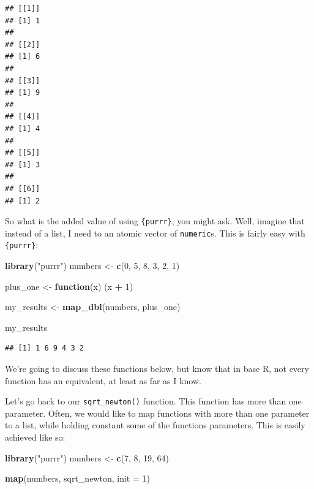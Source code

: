 \documentclass[]{gitbook}
\newenvironment{Shaded}{\begin{snugshade}}{\end{snugshade}}
\newcommand{\ControlFlowTok}[1]{\textcolor[rgb]{0.13,0.29,0.53}{\textbf{#1}}}
\newcommand{\DataTypeTok}[1]{\textcolor[rgb]{0.13,0.29,0.53}{#1}}
\newcommand{\DecValTok}[1]{\textcolor[rgb]{0.00,0.00,0.81}{#1}}
\newcommand{\KeywordTok}[1]{\textcolor[rgb]{0.13,0.29,0.53}{\textbf{#1}}}
\newcommand{\NormalTok}[1]{#1}
\newcommand{\OperatorTok}[1]{\textcolor[rgb]{0.81,0.36,0.00}{\textbf{#1}}}
\newcommand{\StringTok}[1]{\textcolor[rgb]{0.31,0.60,0.02}{#1}}
\begin{document}
\begin{verbatim}
## [[1]]
## [1] 1
## 
## [[2]]
## [1] 6
## 
## [[3]]
## [1] 9
## 
## [[4]]
## [1] 4
## 
## [[5]]
## [1] 3
## 
## [[6]]
## [1] 2
\end{verbatim}

So what is the added value of using \texttt{\{purrr\}}, you might ask. Well, imagine that instead of a list,
I need to an atomic vector of \texttt{numeric}s. This is fairly easy with \texttt{\{purrr\}}:

\begin{Shaded}
\begin{Highlighting}[]
\KeywordTok{library}\NormalTok{(}\StringTok{"purrr"}\NormalTok{)}
\NormalTok{numbers <-}\StringTok{ }\KeywordTok{c}\NormalTok{(}\DecValTok{0}\NormalTok{, }\DecValTok{5}\NormalTok{, }\DecValTok{8}\NormalTok{, }\DecValTok{3}\NormalTok{, }\DecValTok{2}\NormalTok{, }\DecValTok{1}\NormalTok{)}

\NormalTok{plus_one <-}\StringTok{ }\ControlFlowTok{function}\NormalTok{(x) (x }\OperatorTok{+}\StringTok{ }\DecValTok{1}\NormalTok{)}

\NormalTok{my_results <-}\StringTok{ }\KeywordTok{map_dbl}\NormalTok{(numbers, plus_one)}

\NormalTok{my_results}
\end{Highlighting}
\end{Shaded}

\begin{verbatim}
## [1] 1 6 9 4 3 2
\end{verbatim}

We're going to discuss these functions below, but know that in base R, not every function has an
equivalent, at least as far as I know.

Let's go back to our \texttt{sqrt\_newton()} function. This function has more than one parameter. Often,
we would like to map functions with more than one parameter to a list, while holding constant
some of the functions parameters. This is easily achieved like so:

\begin{Shaded}
\begin{Highlighting}[]
\KeywordTok{library}\NormalTok{(}\StringTok{"purrr"}\NormalTok{)}
\NormalTok{numbers <-}\StringTok{ }\KeywordTok{c}\NormalTok{(}\DecValTok{7}\NormalTok{, }\DecValTok{8}\NormalTok{, }\DecValTok{19}\NormalTok{, }\DecValTok{64}\NormalTok{)}

\KeywordTok{map}\NormalTok{(numbers, sqrt_newton, }\DataTypeTok{init =} \DecValTok{1}\NormalTok{)}
\end{Highlighting}
\end{Shaded}
\end{document}
